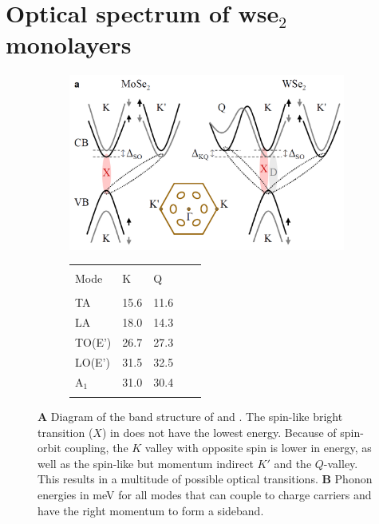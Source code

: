 \section{Optical spectrum of ws\textup{e}$_2$ monolayers}\label{composition}

\begin{figure}[t]
\centering
\begin{subfigure}{0.69\textwidth}
	\caption{}
	\includegraphics[width=.8\textwidth]{Band_structure_momentum_dark}
\end{subfigure}
\begin{subfigure}{0.3\textwidth}
	\caption{}
	\begin{tabular}{lllll}
	\hline
	\hline\\
	Mode&K&Q\\
	\hline\\
	TA&15.6&11.6\\
	LA&18.0&14.3\\
	TO(E')&26.7&27.3\\
	LO(E')&31.5&32.5\\
	A$_1$&31.0&30.4\\
	\\\hline
	\end{tabular}
\end{subfigure}
\caption{\textbf{A} Diagram of the band structure of \mose and \wse\!. The spin-like bright transition ($X$) in \wse does not have the lowest energy. Because of spin-orbit coupling, the $K$ valley with opposite spin is lower in energy, as well as the spin-like but momentum indirect $K'$ and the $Q$-valley. This results in a multitude of possible optical transitions. \textbf{B} Phonon energies in meV for all modes that can couple to charge carriers and have the right momentum to form a sideband\cite{jin_intrinsic_2014}.}\label{phonon_band}
\end{figure}

